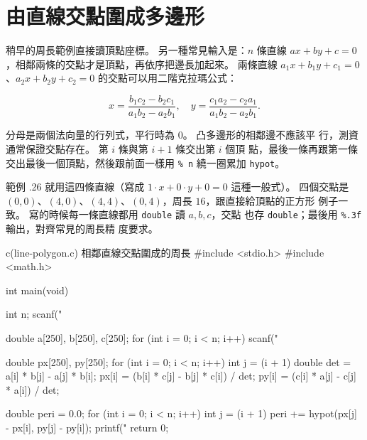 \section{由直線交點圍成多邊形}
\label{sec:float-line-intersect}

稍早的周長範例直接讀頂點座標。 另一種常見輸入是：$n$ 條直線
$ax+by+c=0$，相鄰兩條的交點才是頂點，再依序把邊長加起來。 兩條直線
$a_1x+b_1y+c_1=0$、$a_2x+b_2y+c_2=0$ 的交點可以用二階克拉瑪公式：

\[
x = \frac{b_1 c_2 - b_2 c_1}{a_1 b_2 - a_2 b_1},\quad
y = \frac{c_1 a_2 - c_2 a_1}{a_1 b_2 - a_2 b_1}.
\]

分母是兩個法向量的行列式，平行時為 $0$。 凸多邊形的相鄰邊不應該平
行，測資通常保證交點存在。 第 $i$ 條與第 $i+1$ 條交出第 $i$ 個頂
點，最後一條再跟第一條交出最後一個頂點，然後跟前面一樣用
\texttt{\% n} 繞一圈累加 \texttt{hypot}。

\begin{center}
\label{fig:ch07-polygon-intersections}
\end{center}

範例 \thechapter.26 就用這四條直線（寫成
$1\cdot x+0\cdot y+0=0$ 這種一般式）。 四個交點是
$(0,0)$、$(4,0)$、$(4,4)$、$(0,4)$，周長 $16$，跟直接給頂點的正方形
例子一致。 寫的時候每一條直線都用 \texttt{double} 讀 $a,b,c$，交點
也存 \texttt{double}；最後用 \texttt{\%.3f} 輸出，對齊常見的周長精
度要求。

\begin{example}{c}{(line-polygon.c) 相鄰直線交點圍成的周長}
#include <stdio.h>
#include <math.h>

int main(void) {
    int n;
    scanf("%

    double a[250], b[250], c[250];
    for (int i = 0; i < n; i++) {
        scanf("%
    }

    double px[250], py[250];
    for (int i = 0; i < n; i++) {
        int j = (i + 1) %
        double det = a[i] * b[j] - a[j] * b[i];
        px[i] = (b[i] * c[j] - b[j] * c[i]) / det;
        py[i] = (c[i] * a[j] - c[j] * a[i]) / det;
    }

    double peri = 0.0;
    for (int i = 0; i < n; i++) {
        int j = (i + 1) %
        peri += hypot(px[j] - px[i], py[j] - py[i]);
    }
    printf("%
    return 0;
}
\end{example}

